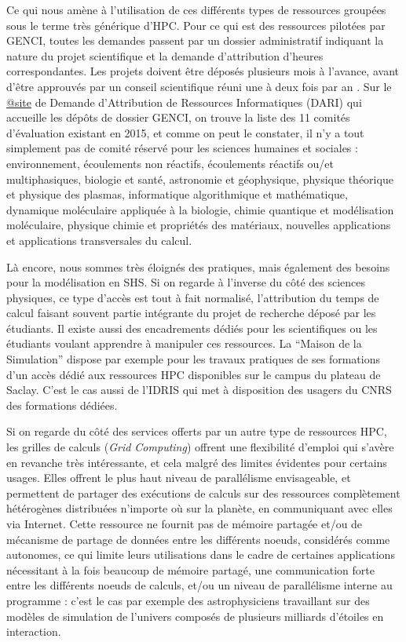Ce qui nous amène à l'utilisation de ces différents types de ressources groupées sous le terme très générique d'HPC. Pour ce qui est des ressources pilotées par GENCI, toutes les demandes passent par un dossier administratif indiquant la nature du projet scientifique et la demande d'attribution d'heures correspondantes. Les projets doivent être déposés plusieurs mois à l'avance, avant d'être approuvés par un conseil scientifique réuni une à deux fois par an \autocite{GENCI2015}. Sur le \href{https://www.edari.fr/}{@site} de Demande d'Attribution de Ressources Informatiques (DARI) qui accueille les dépôts de dossier GENCI, on trouve la liste des 11 comités d'évaluation existant en 2015, et comme on peut le constater, il n'y a tout simplement pas de comité réservé pour les sciences humaines et sociales : environnement, écoulements non réactifs, écoulements réactifs ou/et multiphasiques, biologie et santé, astronomie et géophysique, physique théorique et physique des plasmas, informatique algorithmique et mathématique, dynamique moléculaire appliquée à la biologie, chimie quantique et modélisation moléculaire, physique chimie et propriétés des matériaux, nouvelles applications et applications transversales du calcul.

Là encore, nous sommes très éloignés des pratiques, mais également des besoins pour la modélisation en SHS. Si on regarde à l'inverse du côté des sciences physiques, ce type d'accès est tout à fait normalisé, l'attribution du temps de calcul faisant souvent partie intégrante du projet de recherche déposé par les étudiants. Il existe aussi des encadrements dédiés pour les scientifiques ou les étudiants voulant apprendre à manipuler ces ressources. La \enquote{Maison de la Simulation} dispose par exemple pour les travaux pratiques de ses formations d'un accès dédié aux ressources HPC disponibles sur le campus du plateau de Saclay. C'est le cas aussi de l'IDRIS qui met à disposition des usagers du CNRS des formations dédiées. 

Si on regarde du côté des services offerts par un autre type de ressources HPC, les grilles de calculs (\textit{Grid Computing}) offrent une flexibilité d'emploi qui s'avère en revanche très intéressante, et cela malgré des limites évidentes pour certains usages.
Elles offrent le plus haut niveau de parallélisme envisageable, et permettent de partager des exécutions de calculs sur des ressources complètement hétérogènes distribuées n'importe où sur la planète, en communiquant avec elles via Internet. Cette ressource ne fournit pas de mémoire partagée et/ou de mécanisme de partage de données entre les différents noeuds, considérés comme autonomes, ce qui limite leurs utilisations dans le cadre de certaines applications nécessitant à la fois beaucoup de mémoire partagé, une communication forte entre les différents noeuds de calculs, et/ou un niveau de parallélisme interne au programme : c'est le cas par exemple des astrophysiciens travaillant sur des modèles de simulation de l'univers composés de plusieurs milliards d'étoiles en interaction.

